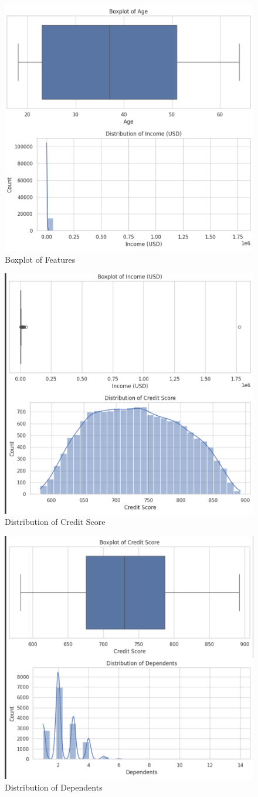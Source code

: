 \documentclass{article}
\begin{document}
\begin{figure}[H]
    \centering
    \includegraphics[width=0.5\linewidth]{BoxPlot1.png}
    \caption{Boxplot of Features}
    \label{fig:boxplot}
\end{figure}

\begin{figure}[H]
    \centering
    \includegraphics[width=0.5\linewidth]{CreditScore.png}
    \caption{Distribution of Credit Score}
    \label{fig:creditscore}
\end{figure}

\begin{figure}[H]
    \centering
    \includegraphics[width=0.5\linewidth]{Dependents.png}
    \caption{Distribution of Dependents}
    \label{fig:dependents}
\end{figure}
\end{document}
